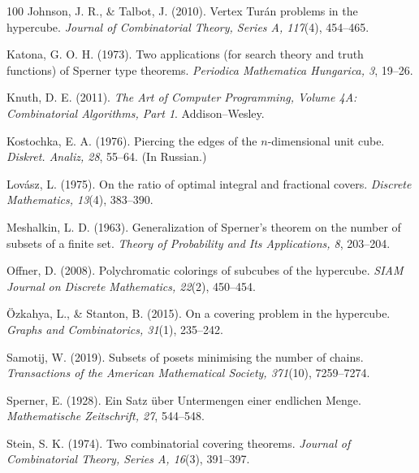 \documentclass[11pt]{article}
\theoremstyle{definition}
\theoremstyle{remark}
\begin{document}
\begin{thebibliography}{100}
Johnson, J. R., \& Talbot, J. (2010).
Vertex Tur\'an problems in the hypercube.
\emph{Journal of Combinatorial Theory, Series A, 117}(4), 454--465.

Katona, G. O. H. (1973).
Two applications (for search theory and truth functions) of Sperner type theorems.
\emph{Periodica Mathematica Hungarica, 3}, 19--26.

Knuth, D. E. (2011).
\emph{The Art of Computer Programming, Volume 4A:
Combinatorial Algorithms, Part 1}.
Addison--Wesley.

Kostochka, E. A. (1976).
Piercing the edges of the $n$-dimensional unit cube.
\emph{Diskret. Analiz, 28}, 55--64.
(In Russian.)

Lov\'asz, L. (1975).
On the ratio of optimal integral and fractional covers.
\emph{Discrete Mathematics, 13}(4), 383--390.

Meshalkin, L. D. (1963).
Generalization of Sperner's theorem on the number of subsets of a finite set.
\emph{Theory of Probability and Its Applications, 8}, 203--204.

Offner, D. (2008).
Polychromatic colorings of subcubes of the hypercube.
\emph{SIAM Journal on Discrete Mathematics, 22}(2), 450--454.

\"Ozkahya, L., \& Stanton, B. (2015).
On a covering problem in the hypercube.
\emph{Graphs and Combinatorics, 31}(1), 235--242.

Samotij, W. (2019).
Subsets of posets minimising the number of chains.
\emph{Transactions of the American Mathematical Society, 371}(10), 7259--7274.

Sperner, E. (1928).
Ein Satz \"uber Untermengen einer endlichen Menge.
\emph{Mathematische Zeitschrift, 27}, 544--548.

Stein, S. K. (1974).
Two combinatorial covering theorems.
\emph{Journal of Combinatorial Theory, Series A, 16}(3), 391--397.

\end{thebibliography}
\end{document}
